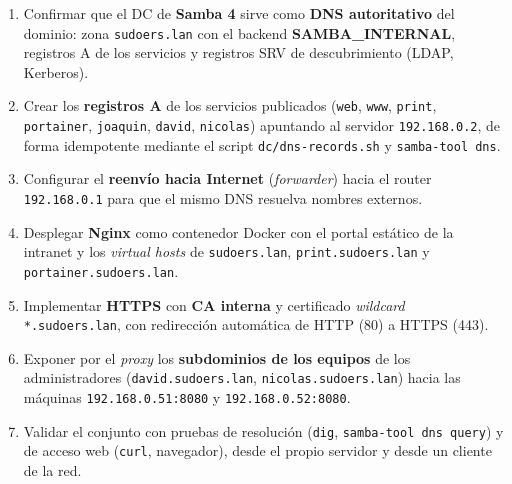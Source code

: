 \begin{enumerate}[label=\textbf{\arabic*.}]
  \item Confirmar que el DC de \textbf{Samba 4} sirve como \textbf{DNS
        autoritativo} del dominio: zona \texttt{sudoers.lan} con el backend
        \textbf{SAMBA\_INTERNAL}, registros A de los servicios y registros
        SRV de descubrimiento (LDAP, Kerberos).
  \item Crear los \textbf{registros A} de los servicios publicados
        (\texttt{web}, \texttt{www}, \texttt{print}, \texttt{portainer},
        \texttt{joaquin}, \texttt{david}, \texttt{nicolas}) apuntando al
        servidor \texttt{192.168.0.2}, de forma idempotente mediante el
        script \texttt{dc/dns-records.sh} y \texttt{samba-tool dns}.
  \item Configurar el \textbf{reenv\'io hacia Internet} (\textit{forwarder})
        hacia el router \texttt{192.168.0.1} para que el mismo DNS resuelva
        nombres externos.
  \item Desplegar \textbf{Nginx} como contenedor Docker con el portal
        est\'atico de la intranet y los \textit{virtual hosts} de
        \texttt{sudoers.lan}, \texttt{print.sudoers.lan} y
        \texttt{portainer.sudoers.lan}.
  \item Implementar \textbf{HTTPS} con \textbf{CA interna} y certificado
        \textit{wildcard} \texttt{*.sudoers.lan}, con redirecci\'on autom\'atica
        de HTTP (80) a HTTPS (443).
  \item Exponer por el \textit{proxy} los \textbf{subdominios de los equipos}
        de los administradores (\texttt{david.sudoers.lan},
        \texttt{nicolas.sudoers.lan}) hacia las m\'aquinas
        \texttt{192.168.0.51:8080} y \texttt{192.168.0.52:8080}.
  \item Validar el conjunto con pruebas de resoluci\'on (\texttt{dig},
        \texttt{samba-tool dns query}) y de acceso web (\texttt{curl},
        navegador), desde el propio servidor y desde un cliente de la red.
\end{enumerate}